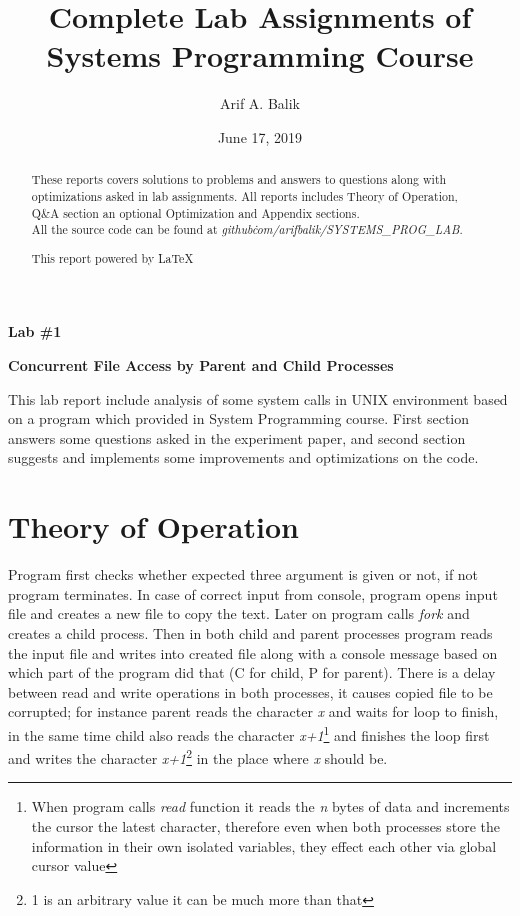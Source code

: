 \documentclass[11pt]{article}
\title{Complete Lab Assignments of Systems Programming Course}
\author{Arif A. Balik}
\affil{Undergraduate Student\\
	Sytstems Programming\\
	Department of Computer Science\\
	Arel University\\
	Büyükçekmece, İstanbul 34537\\
    Email: arifbalik@outlook.com
}
\date{June 17, 2019}                                           %
\makeatletter
\renewenvironment{titlepage}
    {%
      \cleardoublepage
      \if@twocolumn
        \@restonecoltrue\onecolumn
      \else
        \@restonecolfalse\newpage
      \fi
      \thispagestyle{empty}%
    }%
    {\if@restonecol\twocolumn \else \newpage \fi
    }
\renewenvironment{titlepage}
    {%
      \cleardoublepage
      \if@twocolumn
        \@restonecoltrue\onecolumn
      \else
        \@restonecolfalse\newpage
      \fi
      \thispagestyle{empty}%
    }%
    {\if@restonecol\twocolumn \else \newpage \fi
     \if@twoside\else
     \fi
    }
\makeatother
\begin{document}
\maketitle

\begin{abstract}
These reports covers solutions to problems and answers to questions along with optimizations asked in lab assignments. All reports includes Theory of Operation, Q\&A section an optional Optimization and Appendix sections.\\ All the source code can be found at \textit{github\.com/arifbalik/SYSTEMS\_PROG\_LAB}. 

This report powered by \LaTeX{}
\end{abstract}

\begin{titlepage}
   \begin{center}
       \vspace*{5cm}
 
       \textbf{ \LARGE Lab \#1}
       
       \vspace{0.5cm}
 	\textbf{Concurrent File Access by Parent and Child Processes}
 	
       \vspace{0.5cm}
         This lab report include analysis of some system calls in UNIX environment based on a program which provided in System Programming course. First section answers some questions asked in the experiment paper, and second section suggests and implements some improvements and optimizations on the code.

 
   \end{center}
\end{titlepage}


\section*{Theory of Operation}
Program first checks whether expected three argument is given or not, if not program terminates. In case of correct input from console, program opens input file and creates a new file to copy the text. Later on program calls \textit{fork} and creates a child process. Then in both child and parent processes program reads the input file and writes into created file along with a console message based on which part of the program did that (C for child, P for parent). There is a delay between read and write operations in both processes, it causes copied file to be corrupted; for instance parent reads the character \textit{x} and waits for loop to finish, in the same time child also reads the character \textit{x+1}\footnote{When program calls \textit{read} function it reads the \textit{n} bytes of data and increments the cursor the latest character, therefore even when both processes store the information in their own isolated variables, they effect each other via global cursor value} and finishes the loop first and writes the character \textit{x+1}\footnote{1 is an arbitrary value it can be much more than that} in the place where \textit{x} should be.
\end{document}
